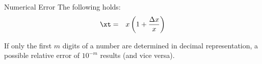 \documentclass[11pt,compress,t,notes=noshow, xcolor=table]{beamer}
\begin{document}
\begin{vbframe}{Numerical Error}
The following holds:
\begin{eqnarray*}
  \label{eq:1}
  \xt &=& x \left(1+\frac{\Delta x}{x}\right)
\end{eqnarray*}

If only the first $m$ digits of a number are determined in decimal representation,
a possible relative error of $10^{-m}$ results (and vice versa).

\framebreak









\end{vbframe}
\end{document}

